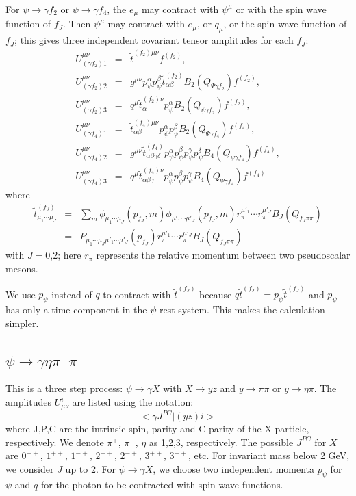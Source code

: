 For $\psi\to\gamma f_2$ or $\psi\to\gamma f_4$, the $e_\mu$ may
contract with $\psi^\mu$ or with the spin wave function of $f_J$.
Then $\psi^\mu$ may contract with $e_\mu$, or $q_\mu$, or the spin
wave function of $f_J$; this gives three independent covariant
tensor amplitudes for each $f_J$:
\begin{eqnarray}
U^{\mu\nu}_{(\gamma f_2)1}
\!&=&\! \tilde t^{(f_2)\mu\nu}f^{(f_2)}, \\
U^{\mu\nu}_{(\gamma f_2)2} \!&=&\! g^{\mu\nu}p_\psi^\alpha
p_\psi^\beta \tilde t^{(f_2)}_{\alpha\beta}
B_2(Q_{\Psi\gamma f_2})f^{(f_2)}, \\
U^{\mu\nu}_{(\gamma f_2)3}
 \!&=&\! q^\mu \tilde t^{(f_2)\nu}_{\alpha}p_\psi^\alpha
                B_2(Q_{\psi\gamma f_2})f^{(f_2)}, \\
U^{\mu\nu}_{(\gamma f_4)1}
 \!&=&\! \tilde t^{(f_4)\mu\nu}_{\alpha\beta}p_\psi^\alpha p_\psi^\beta
B_2(Q_{\Psi\gamma f_4})f^{(f_4)} ,\\
U^{\mu\nu}_{(\gamma f_4)2} \!&=&\! g^{\mu\nu} \tilde
t^{(f_4)}_{\alpha\beta\gamma\delta} p_\psi^\alpha p_\psi^\beta
p_\psi^\gamma p_\psi^\delta B_4(Q_{\psi\gamma f_4})f^{(f_4)} ,\\
U^{\mu\nu}_{(\gamma f_4)3} \!&=&\! q^\mu \tilde
t^{(f_4)\nu}_{\alpha\beta\gamma} p_\psi^\alpha p_\psi^\beta
p_\psi^\gamma B_4(Q_{\Psi\gamma f_4})f^{(f_4)}
\end{eqnarray}
where
\begin{eqnarray}
\tilde t^{(f_J)}_{\mu_1\cdots\mu_J}
&=&\sum_m\phi_{\mu_1\cdots\mu_J}(p_{f_J},m)
\phi_{\mu'_1\cdots\mu'_J}(p_{f_J},m) r^{\mu'_1}_\pi\cdots
r^{\mu'_J}_\pi B_J(Q_{f_J\pi\pi}) \nonumber \\ &=&
P_{\mu_1\cdots\mu_J\mu'_1\cdots\mu'_J}(p_{f_J})
r^{\mu'_1}_\pi\cdots r^{\mu'_J}_\pi B_J(Q_{f_J\pi\pi})
\end{eqnarray}
with $J=0$,2; here $r_\pi$ represents the relative momentum
between two pseudoscalar mesons.

We use $p_\psi$ instead of $q$ to contract with $\tilde t^{(f_J)}$
because $q\tilde t^{(f_J)}=p_\psi \tilde t^{(f_J)}$ and $p_\psi$
has only a time component in the $\psi$ rest system. This makes
the calculation simpler.

\subsection{$\psi\to\gamma\eta\pi^+\pi^-$}

This is a three step process: $\psi\to\gamma X$ with $X\to yz$ and
$y\to\pi\pi$ or $y\to\eta\pi$. The amplitudes $U^i_{\mu\nu}$ are
listed using the notation:
%
\begin{equation}
<\gamma J^{PC}|(yz)i> \nonumber
\end{equation}
%
where J,P,C are the intrinsic spin, parity and C-parity of the X
particle, respectively. We denote $\pi^+$, $\pi^-$, $\eta$ as
1,2,3, respectively. The possible $J^{PC}$ for $X$ are $0^{-+}$,
$1^{++}$, $1^{-+}$, $2^{++}$, $2^{-+}$, $3^{++}$, $3^{-+}$, etc.
For invariant mass below 2 GeV, we consider $J$ up to 2. For
$\psi\to\gamma X$, we choose two independent momenta $p_\psi$ for
$\psi$ and $q$ for the photon to be contracted with spin wave
functions.

